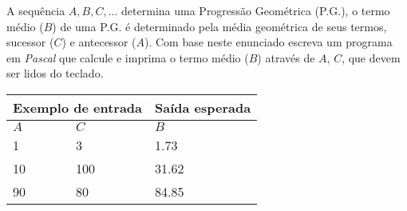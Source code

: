 \item A sequência $A, B, C, \ldots$ determina uma Progressão Geométrica (P.G.),
o termo médio ($B$) de uma P.G. é determinado pela média geométrica de seus
termos, sucessor ($C$) e antecessor ($A$). Com base neste enunciado escreva
um programa em \emph{Pascal} que calcule e imprima o termo médio ($B$)
através de $A$, $C$, que devem ser lidos do teclado.

\begin{center}
\begin{tabular}{|l|l|l|} \hline
\multicolumn{2}{|c|}{Exemplo de entrada} & Saída esperada \\ \hline
$A$ & $C$    & $B$               \\ \hline
1 & 3        & 1.73                \\ \hline
10 & 100        & 31.62             \\ \hline
90 & 80    & 84.85          \\ \hline
\end{tabular}
\end{center}
